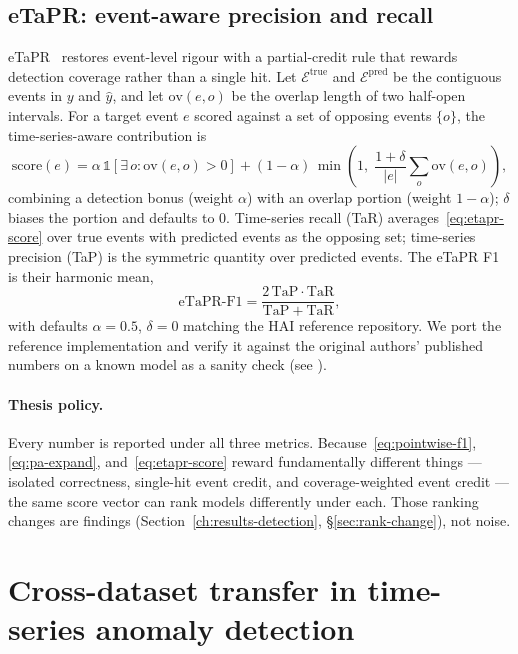 \subsection{eTaPR: event-aware precision and recall}
\label{sec:metric-etapr}

eTaPR~\cite{hwang2022etapr} restores event-level rigour with a partial-credit rule that rewards detection coverage rather than a single hit.  Let $\mathcal{E}^{\mathrm{true}}$ and $\mathcal{E}^{\mathrm{pred}}$ be the contiguous events in $y$ and $\hat{y}$, and let $\mathrm{ov}(e, o)$ be the overlap length of two half-open intervals.  For a target event $e$ scored against a set of opposing events $\{o\}$, the time-series-aware contribution is
\begin{equation}
  \mathrm{score}(e) = \alpha\, \mathbb{1}\!\left[\exists\, o : \mathrm{ov}(e,o) > 0\right]
  + (1-\alpha)\,\min\!\left(1,\; \frac{1+\delta}{|e|}\sum_{o} \mathrm{ov}(e, o)\right),
  \label{eq:etapr-score}
\end{equation}
combining a detection bonus (weight $\alpha$) with an overlap portion (weight $1-\alpha$); $\delta$ biases the portion and defaults to $0$.  Time-series recall (TaR) averages~\eqref{eq:etapr-score} over true events with predicted events as the opposing set; time-series precision (TaP) is the symmetric quantity over predicted events.  The eTaPR F1 is their harmonic mean,
\begin{equation}
  \mathrm{eTaPR\text{-}F1} = \frac{2\,\mathrm{TaP}\cdot\mathrm{TaR}}{\mathrm{TaP} + \mathrm{TaR}},
\end{equation}
with defaults $\alpha = 0.5$, $\delta = 0$ matching the HAI reference repository.  We port the reference implementation and verify it against the original authors' published numbers on a known model as a sanity check (see ).

\paragraph{Thesis policy.}  Every number is reported under all three metrics.  Because~\eqref{eq:pointwise-f1}, \eqref{eq:pa-expand}, and~\eqref{eq:etapr-score} reward fundamentally different things --- isolated correctness, single-hit event credit, and coverage-weighted event credit --- the same score vector can rank models differently under each.  Those ranking changes are findings (Section~\ref{ch:results-detection}, \S\ref{sec:rank-change}), not noise.

\section{Cross-dataset transfer in time-series anomaly detection}

